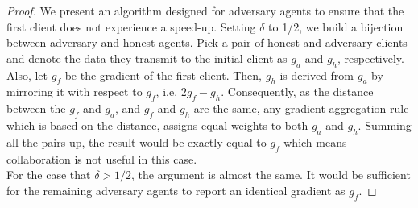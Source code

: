 \documentclass[a4paper,11pt]{article}
\theoremstyle{definition}
\begin{document}
\begin{proof}
    We present an algorithm designed for adversary agents to ensure that the first client does not experience a speed-up. Setting $\delta$ to 1/2, we build a bijection between adversary and honest agents. Pick a pair of honest and adversary clients and denote the data they transmit to the initial client as $g_a$ and $g_h$, respectively. Also, let $g_f$ be the gradient of the first client. Then, $g_h$ is derived from $g_a$ by mirroring it with respect to $g_f$, i.e. $2g_f - g_h$.
    Consequently, as the distance between the $g_f$ and $g_a$, and $g_f$ and $g_h$ are the same, any gradient aggregation rule which is based on the distance, assigns equal weights to both $g_a$ and $g_h$. Summing all the pairs up, the result would be exactly equal to $g_f$ which means collaboration is not useful in this case.\\
    For the case that $\delta > 1/2$, the argument is almost the same. It would be sufficient for the remaining adversary agents to report an identical gradient as $g_f$.
\end{proof}
\end{document}

